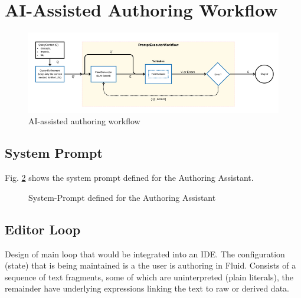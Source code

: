 \section{AI-Assisted Authoring Workflow}
\label{sec:authoring-workflow}

\begin{figure}
    \centering
    \includegraphics[width=0.95\linewidth]{fig/authoring-assistant-architecture.png}
    \caption{AI-assisted authoring workflow}\label{fig:architecture}
\end{figure}

\subsection{System Prompt}
\label{subsec:system-prompt}
Fig. \ref{fig:system-prompt} shows the system prompt defined for the Authoring Assistant.

\begin{figure}[h]
    \centering
    \begin{tcolorbox}[colback=gray!10, colframe=gray!50, boxrule=0.5pt, arc=2pt,
        left=6pt, right=6pt, top=4pt, bottom=4pt]
    \end{tcolorbox}
    \vspace{-0.5em}
    \caption{System-Prompt defined for the Authoring Assistant}
    \label{fig:system-prompt}
\end{figure}


\subsection{Editor Loop}
\label{subsec:editor-loop}
Design of main loop that would be integrated into an IDE. The configuration (state) that is being maintained
is a  the user is authoring in Fluid. Consists of a sequence of text fragments, some of which
are uninterpreted (plain literals), the remainder have underlying expressions linking the text to raw or derived
data.

